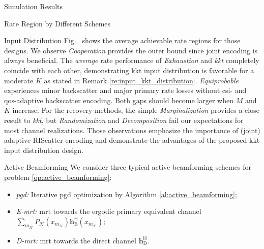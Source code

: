 \documentclass[journal,12pt,onecolumn,draftclsnofoot]{IEEEtran}
\theoremstyle{remark}
\begin{document}
\begin{section}{Simulation Results}
\begin{subsection}{Rate Region by Different Schemes}
\begin{subsubsection}{Input Distribution}
			Fig.~ shows the average achievable rate regions for those designs.
			We observe \emph{Cooperation} provides the outer bound since joint encoding is always beneficial.
			The \emph{average} rate performance of \emph{Exhaustion} and \emph{\gls{kkt}} completely coincide with each other, demonstrating \gls{kkt} input distribution is favorable for a moderate $K$ as stated in Remark \ref{re:input_kkt_distribution}.
			\emph{Equiprobable} experiences minor backscatter and major primary rate losses without \gls{csi}- and \gls{qos}-adaptive backscatter encoding.
			Both gaps should become larger when $M$ and $K$ increase.
			For the recovery methods, the simple \emph{Marginalization} provides a close result to \emph{\gls{kkt}}, but \emph{Randomization} and \emph{Decomposition} fail our expectations for most channel realizations.
			Those observations emphasize the importance of (joint) adaptive RIScatter encoding and demonstrate the advantages of the proposed \gls{kkt} input distribution design.
		\end{subsubsection}

		\begin{subsubsection}{Active Beamforming}
			We consider three typical active beamforming schemes for problem \eqref{op:active_beamforming}:
			\begin{itemize}
				\item \emph{\gls{pgd}:} Iterative \gls{pgd} optimization by Algorithm \ref{al:active_beamforming};
				\item \emph{E-\gls{mrt}:} \gls{mrt} towards the ergodic primary equivalent channel $\sum_{m_{\mathcal{K}}} P_{\mathcal{K}}(x_{m_{\mathcal{K}}}) \boldsymbol{h}_{\text{E}}^\mathsf{H}(x_{m_{\mathcal{K}}})$;
				\item \emph{D-\gls{mrt}:} \gls{mrt} towards the direct channel $\boldsymbol{h}_{\text{D}}^\mathsf{H}$.
			\end{itemize}


\end{subsubsection}
\end{subsection}
\end{section}
\end{document}
